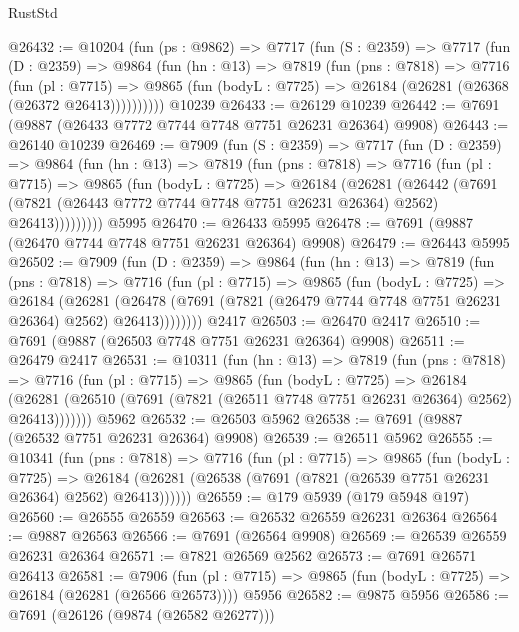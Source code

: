 \begin{lexlean}{RustStd}
\begin{coremodule}
@26432 := @10204
    (fun (ps : @9862) =>
    @7717
      (fun (S : @2359) =>
      @7717
        (fun (D : @2359) =>
        @9864
          (fun (hn : @13) =>
          @7819
            (fun (pns : @7818) =>
            @7716
              (fun (pl : @7715) =>
              @9865 (fun (bodyL : @7725) => @26184 (@26281 (@26368 (@26372 @26413))))))))))
    @10239
@26433 := @26129 @10239
@26442 := @7691 (@9887 (@26433 @7772 @7744 @7748 @7751 @26231 @26364) @9908)
@26443 := @26140 @10239
@26469 := @7909
    (fun (S : @2359) =>
    @7717
      (fun (D : @2359) =>
      @9864
        (fun (hn : @13) =>
        @7819
          (fun (pns : @7818) =>
          @7716
            (fun (pl : @7715) =>
            @9865
              (fun (bodyL : @7725) =>
              @26184
                (@26281
                  (@26442
                    (@7691
                      (@7821 (@26443 @7772 @7744 @7748 @7751 @26231 @26364) @2562)
                      @26413)))))))))
    @5995
@26470 := @26433 @5995
@26478 := @7691 (@9887 (@26470 @7744 @7748 @7751 @26231 @26364) @9908)
@26479 := @26443 @5995
@26502 := @7909
    (fun (D : @2359) =>
    @9864
      (fun (hn : @13) =>
      @7819
        (fun (pns : @7818) =>
        @7716
          (fun (pl : @7715) =>
          @9865
            (fun (bodyL : @7725) =>
            @26184
              (@26281
                (@26478 (@7691 (@7821 (@26479 @7744 @7748 @7751 @26231 @26364) @2562) @26413))))))))
    @2417
@26503 := @26470 @2417
@26510 := @7691 (@9887 (@26503 @7748 @7751 @26231 @26364) @9908)
@26511 := @26479 @2417
@26531 := @10311
    (fun (hn : @13) =>
    @7819
      (fun (pns : @7818) =>
      @7716
        (fun (pl : @7715) =>
        @9865
          (fun (bodyL : @7725) =>
          @26184
            (@26281 (@26510 (@7691 (@7821 (@26511 @7748 @7751 @26231 @26364) @2562) @26413)))))))
    @5962
@26532 := @26503 @5962
@26538 := @7691 (@9887 (@26532 @7751 @26231 @26364) @9908)
@26539 := @26511 @5962
@26555 := @10341
    (fun (pns : @7818) =>
    @7716
      (fun (pl : @7715) =>
      @9865
        (fun (bodyL : @7725) =>
        @26184 (@26281 (@26538 (@7691 (@7821 (@26539 @7751 @26231 @26364) @2562) @26413))))))
@26559 := @179 @5939 (@179 @5948 @197)
@26560 := @26555 @26559
@26563 := @26532 @26559 @26231 @26364
@26564 := @9887 @26563
@26566 := @7691 (@26564 @9908)
@26569 := @26539 @26559 @26231 @26364
@26571 := @7821 @26569 @2562
@26573 := @7691 @26571 @26413
@26581 := @7906
    (fun (pl : @7715) => @9865 (fun (bodyL : @7725) => @26184 (@26281 (@26566 @26573))))
    @5956
@26582 := @9875 @5956
@26586 := @7691 (@26126 (@9874 (@26582 @26277)))

\end{coremodule}
\end{lexlean}
